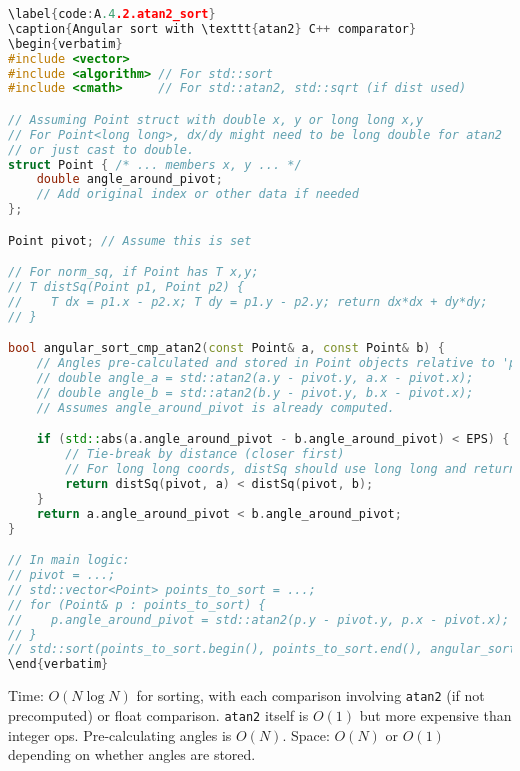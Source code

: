 \begin{lstlisting}[language=C++, caption=Angular sort with \texttt{atan2} C++ comparator]
\label{code:A.4.2.atan2_sort}
\caption{Angular sort with \texttt{atan2} C++ comparator}
\begin{verbatim}
#include <vector>
#include <algorithm> // For std::sort
#include <cmath>     // For std::atan2, std::sqrt (if dist used)

// Assuming Point struct with double x, y or long long x,y
// For Point<long long>, dx/dy might need to be long double for atan2
// or just cast to double.
struct Point { /* ... members x, y ... */
    double angle_around_pivot;
    // Add original index or other data if needed
};

Point pivot; // Assume this is set

// For norm_sq, if Point has T x,y;
// T distSq(Point p1, Point p2) {
//    T dx = p1.x - p2.x; T dy = p1.y - p2.y; return dx*dx + dy*dy;
// }

bool angular_sort_cmp_atan2(const Point& a, const Point& b) {
    // Angles pre-calculated and stored in Point objects relative to 'pivot'
    // double angle_a = std::atan2(a.y - pivot.y, a.x - pivot.x);
    // double angle_b = std::atan2(b.y - pivot.y, b.x - pivot.x);
    // Assumes angle_around_pivot is already computed.

    if (std::abs(a.angle_around_pivot - b.angle_around_pivot) < EPS) { // EPS from ssec A.3.1
        // Tie-break by distance (closer first)
        // For long long coords, distSq should use long long and return long long
        return distSq(pivot, a) < distSq(pivot, b);
    }
    return a.angle_around_pivot < b.angle_around_pivot;
}

// In main logic:
// pivot = ...;
// std::vector<Point> points_to_sort = ...;
// for (Point& p : points_to_sort) {
//    p.angle_around_pivot = std::atan2(p.y - pivot.y, p.x - pivot.x);
// }
// std::sort(points_to_sort.begin(), points_to_sort.end(), angular_sort_cmp_atan2);
\end{verbatim}
\end{lstlisting}
\begin{complexity}
\label{comp:A.4.2.atan2_sort}
Time: $O(N \log N)$ for sorting, with each comparison involving \texttt{atan2} (if not precomputed) or float comparison. \texttt{atan2} itself is $O(1)$ but more expensive than integer ops. Pre-calculating angles is $O(N)$.
Space: $O(N)$ or $O(1)$ depending on whether angles are stored.
\end{complexity}
